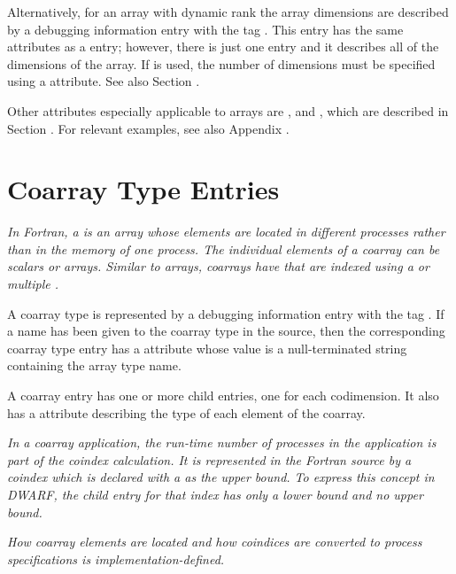 {
Alternatively, for an array with dynamic rank the array dimensions 
are described by a debugging information entry with the tag
\DWTAGgenericsubrangeTARG.
This entry has the same attributes as a
\DWTAGsubrangetype{} entry; however,
there is just one \DWTAGgenericsubrangeNAME{} entry and it describes all of the
dimensions of the array.
If \DWTAGgenericsubrangeNAME{}
is used, the number of dimensions must be specified using a
\DWATrank{} attribute. See also Section
.

Other attributes especially applicable to arrays are
\DWATallocated, 
\DWATassociated{} and 
\DWATdatalocation,
which are described in 
Section . 
For relevant examples, see also Appendix .

\section{Coarray Type Entries}
\label{chap:coarraytypeentries}
\textit{In Fortran, a  is an array whose
elements are located in different processes rather than in the
memory of one process. The individual elements
of a coarray can be scalars or arrays.
Similar to arrays, coarrays have  that are 
indexed using a  or multiple .
}

A coarray type is represented by a debugging information entry 
with the tag \DWTAGcoarraytypeTARG.
If a name has been given to the 
coarray type in the source, then the corresponding coarray type 
entry has a \DWATname{} attribute whose value is a null-terminated 
string containing the array type name.

A coarray entry has one or more \DWTAGsubrangetype{} child entries,
one for each codimension. It also has a \DWATtype{} attribute 
describing the type of each element of the coarray.

\textit{In a coarray application, the run-time number of processes in the application
is part of the coindex calculation.  It is represented in the Fortran source by
a coindex which is declared with a \doublequote{*} as the upper bound.  To express this
concept in DWARF, the \DWTAGsubrangetype{} child entry for that index has 
only a lower bound and no upper bound.}

\textit{How coarray elements are located and how coindices are 
converted to process specifications is implementation-defined.}

}
